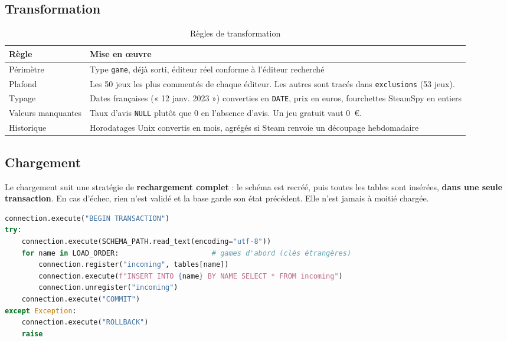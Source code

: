 \documentclass[11pt, a4paper, oneside, headings=normal, numbers=noenddot, DIV=12]{scrartcl}
\begin{document}
\subsection{Transformation}
\begin{table}[H]
\centering\small
\begin{tabularx}{\linewidth}{@{}L{3.4cm} Y@{}}
\toprule
\textbf{Règle} & \textbf{Mise en œuvre} \\
\midrule
Périmètre & Type \texttt{game}, déjà sorti, éditeur réel conforme à l'éditeur recherché \\
Plafond & Les 50 jeux les plus commentés de chaque éditeur. Les autres sont tracés dans \texttt{exclusions} (53 jeux). \\
Typage & Dates françaises (« 12 janv. 2023 ») converties en \texttt{DATE}, prix en euros, fourchettes SteamSpy en entiers \\
Valeurs manquantes & Taux d'avis \texttt{NULL} plutôt que 0 en l'absence d'avis. Un jeu gratuit vaut 0~€. \\
Historique & Horodatages Unix convertis en mois, agrégés si Steam renvoie un découpage hebdomadaire \\
\bottomrule
\end{tabularx}
\caption{Règles de transformation}
\end{table}

\subsection{Chargement}
Le chargement suit une stratégie de \textbf{rechargement complet} : le schéma est recréé, puis toutes les tables sont insérées,
\textbf{dans une seule transaction}. En cas d'échec, rien n'est validé et la base garde son état précédent. Elle n'est jamais à moitié chargée.

\begin{lstlisting}[language=Python]
connection.execute("BEGIN TRANSACTION")
try:
    connection.execute(SCHEMA_PATH.read_text(encoding="utf-8"))
    for name in LOAD_ORDER:                      # games d'abord (clés étrangères)
        connection.register("incoming", tables[name])
        connection.execute(f"INSERT INTO {name} BY NAME SELECT * FROM incoming")
        connection.unregister("incoming")
    connection.execute("COMMIT")
except Exception:
    connection.execute("ROLLBACK")
    raise
\end{lstlisting}

\end{document}
